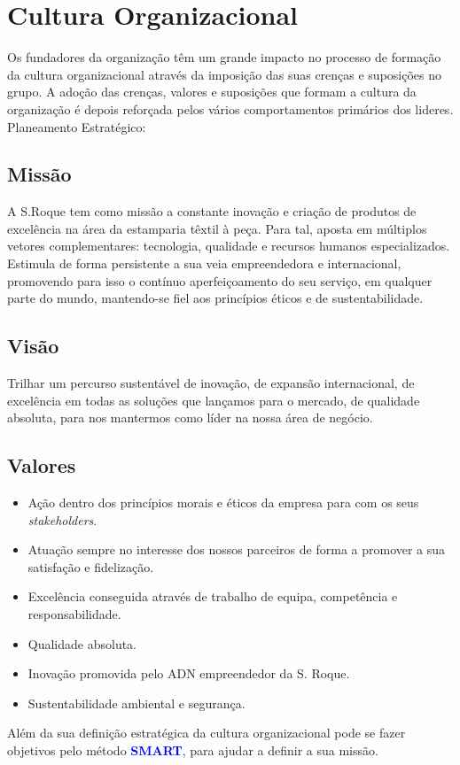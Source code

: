 \section{Cultura Organizacional}
\qquad Os fundadores da organização têm um grande impacto no processo de formação da cultura organizacional através da imposição das suas crenças e suposições no grupo. A adoção das crenças, valores e suposições que formam a cultura da organização é depois reforçada pelos vários comportamentos primários dos lideres.\emptyline
Planeamento Estratégico:
\subsection{Missão}
A S.Roque tem como missão a constante inovação e criação de produtos de excelência na área da estamparia têxtil à peça. Para tal, aposta em múltiplos vetores complementares: tecnologia, qualidade e recursos humanos especializados. Estimula de forma persistente a sua veia empreendedora e internacional, promovendo para isso o contínuo aperfeiçoamento do seu serviço, em qualquer parte do mundo, mantendo-se fiel aos princípios éticos e de sustentabilidade.
\subsection{Visão}
Trilhar um percurso sustentável de inovação, de expansão internacional, de excelência em todas as soluções que lançamos para o mercado, de qualidade absoluta, para nos mantermos como líder na nossa área de negócio.
\subsection{Valores}
\begin{itemize}
\setlength\itemsep{-0.3em}
\item Ação dentro dos princípios morais e éticos da empresa para com os seus \textit{stakeholders}.
\item Atuação sempre no interesse dos nossos parceiros de forma a promover a sua satisfação e fidelização.
\item Excelência conseguida através de trabalho de equipa, competência e responsabilidade.
\item Qualidade absoluta.
\item Inovação promovida pelo ADN empreendedor da S. Roque.
\item Sustentabilidade ambiental e segurança.
\end{itemize}\par
Além da sua definição estratégica da cultura organizacional pode se fazer objetivos pelo método \textcolor{blue}{\textbf{SMART}}, para ajudar a definir a sua missão.
